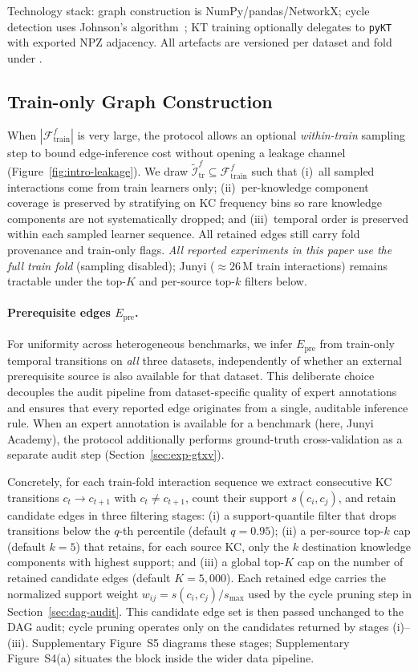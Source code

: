 \documentclass[preprint,10pt,doubleblind]{elsarticle}
\newcommand{\Epre}{\ensuremath{E_{\text{pre}}}}
\newcommand{\KC}{knowledge component}
\newcommand{\KCs}{knowledge components}
\begin{document}
Technology stack: graph construction is NumPy/pandas/NetworkX; cycle
detection uses Johnson's algorithm~\cite{johnson1975finding}; KT training
optionally delegates to \texttt{pyKT}~\cite{liu2022pykt} with exported
NPZ adjacency. All artefacts are versioned per dataset and fold under
.

\subsection{Train-only Graph Construction}
\label{sec:graph}
When $|\mathcal{F}^f_{\text{train}}|$ is very large, the protocol allows
an optional \emph{within-train} sampling step to bound edge-inference cost
without opening a leakage channel (Figure~\ref{fig:intro-leakage}).
We draw $\tilde{\mathcal{I}}^f_{\text{tr}}\subseteq\mathcal{F}^f_{\text{train}}$
such that (i)~all sampled interactions come from train learners only;
(ii)~per-\KC{} coverage is preserved by stratifying on KC frequency bins so
rare \KCs{} are not systematically dropped; and (iii)~temporal order is
preserved within each sampled learner sequence. All retained edges still
carry fold provenance and train-only flags. \emph{All reported experiments
in this paper use the full train fold} (sampling disabled); Junyi
(${\approx}26$\,M train interactions) remains tractable under the
top-$K$ and per-source top-$k$ filters below.

\paragraph{Prerequisite edges $\Epre$.}
For uniformity across heterogeneous benchmarks, we infer $\Epre$ from
train-only temporal transitions on \emph{all} three datasets,
independently of whether an external prerequisite source is also
available for that dataset. This deliberate choice decouples the audit
pipeline from dataset-specific quality of expert annotations and
ensures that every reported edge originates from a single, auditable
inference rule. When an expert annotation is available for a benchmark
(here, Junyi Academy), the protocol additionally performs ground-truth
cross-validation as a separate audit step (Section~\ref{sec:exp-gtxv}).

Concretely, for each train-fold interaction sequence we extract
consecutive KC transitions $c_{t} \rightarrow c_{t+1}$ with
$c_{t} \neq c_{t+1}$, count their support $s(c_i, c_j)$, and retain
candidate edges in three filtering stages:
(i) a support-quantile filter that drops transitions below the
$q$-th percentile (default $q = 0.95$);
(ii) a per-source top-$k$ cap (default $k = 5$) that retains, for each
source KC, only the $k$ destination \KCs{} with highest support; and
(iii) a global top-$K$ cap on the number of retained candidate edges
(default $K = 5{,}000$). Each retained edge carries the normalized
support weight $w_{ij} = s(c_i, c_j) / s_{\max}$ used by the cycle
pruning step in Section~\ref{sec:dag-audit}. This candidate edge set
is then passed unchanged to the DAG audit; cycle pruning operates only
on the candidates returned by stages (i)--(iii).
Supplementary Figure~S5 diagrams these
stages; Supplementary Figure~S4(a) situates the block inside the wider
data pipeline.
\end{document}
